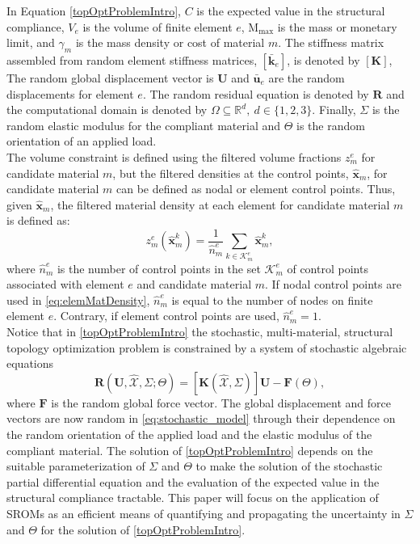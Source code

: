In Equation \eqref{topOptProblemIntro}, ${C}$ is the expected value in the structural compliance, $V_e$ is the volume of finite element $e$, $\mathrm{M}_{\max}$ is the mass or monetary limit, and $\gamma_m$ is the mass density or cost of material $m$. The stiffness matrix assembled from random element stiffness matrices, $[\bar{\bm k}_e]$, is denoted by $[\bm K]$, The random global displacement vector is $\bm U$ and $\bar{\bm u}_e$ are the random displacements for element $e$. The random residual equation is denoted by $\bm{R}$ and the computational domain is denoted by $\Omega\subseteq\mathbb{R}^{d},\ d\in\{1,2,3\}$. Finally, $\Sigma$ is the random elastic modulus for the compliant material and $\Theta$ is the random orientation of an applied load.\\

The volume constraint is defined using the filtered volume fractions $z_m^e$ for candidate material $m$, but the filtered densities at the control points, $\hat{\bm{x}}_m$, for candidate material $m$ can be defined as nodal or element control points. Thus, given $\hat{\bm x}_m$, the filtered material density at each element for candidate material $m$ is defined as:
\begin{equation}
\label{eq:elemMatDensity}
z_m^e(\hat{\bm x}^k_m)=\frac{1}{\hat{n}_m^{e}}\sum_{k\in\mathcal{K}_m^e}\hat{\bm x}^k_m,
\end{equation} 
where $\hat{n}_m^e$ is the number of control points in the set $\mathcal{K}_m^e$ of control points associated with element $e$ and candidate material $m$. If nodal control points are used in \eqref{eq:elemMatDensity}, $\hat{n}_m^e$ is equal to the number of nodes on finite element $e$. Contrary, if element control points are used, $\hat{n}_m^e=1$. \\

Notice that in \eqref{topOptProblemIntro} the stochastic, multi-material, structural topology optimization problem is constrained by a system of stochastic algebraic equations
\begin{equation}
\label{eq:stochastic_model}
\bm R(\bm U, \widehat{\mathcal{X}},  \Sigma; \Theta) = [\bm K( \widehat{\mathcal{X}}, \Sigma)] \bm U - \bm F(\Theta),
\end{equation}
where $\bm F$ is the random global force vector. The global displacement and force vectors are now random in \eqref{eq:stochastic_model} through their dependence on the random orientation of the applied load and the elastic modulus of the compliant material. The solution of \eqref{topOptProblemIntro} depends on the suitable parameterization of $\Sigma$ and $\Theta$ to make the solution of the stochastic partial differential equation and the evaluation of the expected value in the structural compliance tractable. This paper will focus on the application of SROMs as an efficient means of quantifying and propagating the uncertainty in $\Sigma$ and $\Theta$ for the solution of \eqref{topOptProblemIntro}. \\

